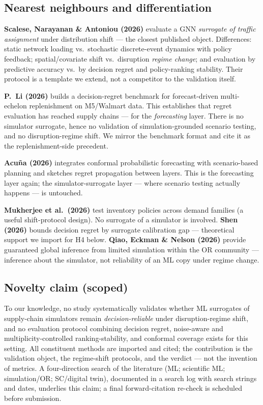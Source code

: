 \documentclass[12pt,a4paper]{article}
\begin{document}
\subsection{Nearest neighbours and differentiation}

\textbf{Scalese, Narayanan \& Antoniou (2026)} \citep{scalese2026} evaluate a GNN \emph{surrogate of traffic assignment} under distribution shift --- the closest published object. Differences: static network loading vs.\ stochastic discrete-event dynamics with policy feedback; spatial/covariate shift vs.\ disruption \emph{regime change}; and evaluation by predictive accuracy vs.\ by decision regret and policy-ranking stability. Their protocol is a template we extend, not a competitor to the validation itself.

\textbf{P.~Li (2026)} \citep{li2026ssrn} builds a decision-regret benchmark for forecast-driven multi-echelon replenishment on M5/Walmart data. This establishes that regret evaluation has reached supply chains --- for the \emph{forecasting} layer. There is no simulator surrogate, hence no validation of simulation-grounded scenario testing, and no disruption-regime shift. We mirror the benchmark format and cite it as the replenishment-side precedent.

\textbf{Acu\~na (2026)} \citep{acuna2026} integrates conformal probabilistic forecasting with scenario-based planning and sketches regret propagation between layers. This is the forecasting layer again; the simulator-surrogate layer --- where scenario testing actually happens --- is untouched.

\textbf{Mukherjee et al.\ (2026)} \citep{mukherjee2026} test inventory policies across demand families (a useful shift-protocol design). No surrogate of a simulator is involved. \textbf{Shen (2026)} \citep{shen2026} bounds decision regret by surrogate calibration gap --- theoretical support we import for H4 below. \textbf{Qiao, Eckman \& Nelson (2026)} \citep{qiao2026} provide guaranteed global inference from limited simulation within the OR community --- inference about the simulator, not reliability of an ML copy under regime change.

\subsection{Novelty claim (scoped)}

To our knowledge, no study systematically validates whether ML surrogates of supply-chain simulators remain \emph{decision-reliable} under disruption-regime shift, and no evaluation protocol combining decision regret, noise-aware and multiplicity-controlled ranking-stability, and conformal coverage exists for this setting. All constituent methods are imported and cited; the contribution is the validation object, the regime-shift protocols, and the verdict --- not the invention of metrics. A four-direction search of the literature (ML; scientific ML; simulation/OR; SC/digital twin), documented in a search log with search strings and dates, underlies this claim; a final forward-citation re-check is scheduled before submission.
\end{document}
